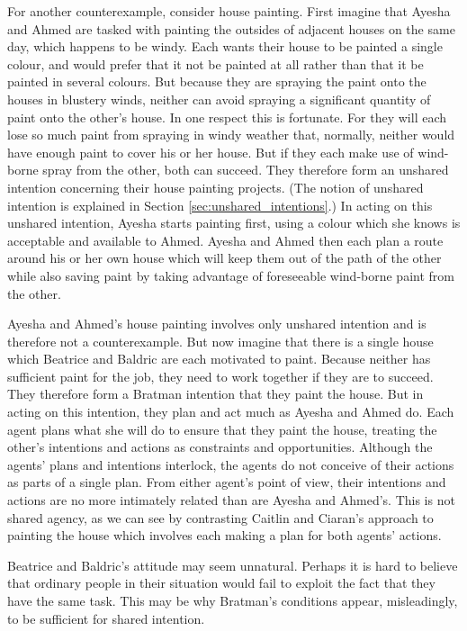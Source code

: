 \documentclass[12pt,\papersize]{extarticle}
\begin{document}
For another counterexample, consider house painting.  
First imagine that Ayesha and Ahmed are tasked with painting the outsides of adjacent houses on the same day,
which happens to be windy.
Each wants their house to be painted a single colour, and would prefer that it not be painted at all rather than that it be painted in several colours.
But because they are spraying the paint onto the houses in blustery winds, neither can avoid spraying a significant quantity of paint onto the other's house. 
In one respect this is fortunate. 
For they will each lose so much paint from spraying in windy weather that, normally, neither would have enough paint to cover his or her house.
But if they each make use of wind-borne spray from the other, both can succeed.
They therefore form an unshared intention concerning their house painting projects. 
(The notion of  unshared intention is explained in Section \vref{sec:unshared_intentions}.)
In acting on this unshared intention,
Ayesha starts painting first, using a colour which she knows is acceptable and available to Ahmed.
Ayesha and Ahmed then each plan a route around his or her own house which will keep them out of the path of the other  while also saving paint by taking advantage of foreseeable  wind-borne paint from the other.

Ayesha and Ahmed's house painting involves only unshared intention and is therefore not a counterexample.
But now imagine that there is a single house which Beatrice and Baldric are each motivated to paint.
Because neither has sufficient paint for the job, they need to work together if they are to succeed.
They therefore form a Bratman intention that they paint the house.
But in acting on this intention, they plan and act much as Ayesha and Ahmed do.
Each agent plans what she will do to ensure that they paint the house, treating the other's intentions and actions as constraints and opportunities. 
Although the agents' plans and intentions interlock, 
the agents do not conceive of their actions as parts of a single plan.
From either agent's point of view, their intentions and actions are no more intimately related than are Ayesha and Ahmed's.
This is not shared agency, 
as we can see by contrasting Caitlin and Ciaran's approach to painting the house which involves each making a plan for both agents' actions.


Beatrice and Baldric's attitude may seem unnatural. 
Perhaps it is hard to believe that ordinary people in their situation would  fail to exploit the fact that they have the same task.
This may be why Bratman's conditions appear, misleadingly, to be sufficient for shared intention.
\end{document}

